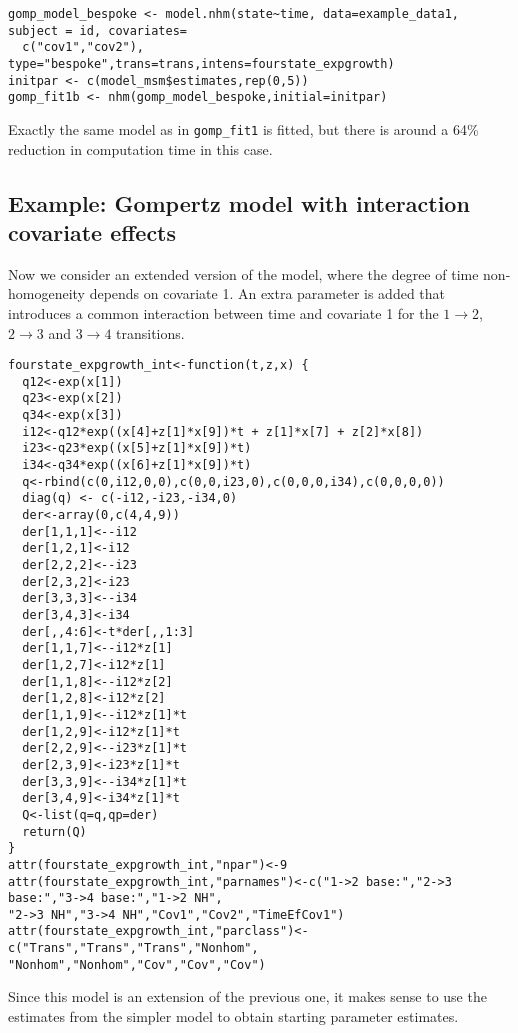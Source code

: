 \documentclass{article}
\numberwithin{equation}{section}
\begin{document}
\begin{verbatim}
gomp_model_bespoke <- model.nhm(state~time, data=example_data1, subject = id, covariates=
  c("cov1","cov2"),   type="bespoke",trans=trans,intens=fourstate_expgrowth)
initpar <- c(model_msm$estimates,rep(0,5))
gomp_fit1b <- nhm(gomp_model_bespoke,initial=initpar)
\end{verbatim}
Exactly the same model as in \verb!gomp_fit1! is fitted, but there is around a 64\% reduction in computation time in this case.

\subsection{Example: Gompertz model with interaction covariate effects}

Now we consider an extended version of the model, where the degree of time non-homogeneity depends on covariate 1. An extra parameter is added that introduces a common interaction between time and covariate 1 for the $1 \rightarrow 2$, $2 \rightarrow 3$ and $3 \rightarrow 4$ transitions.

\begin{verbatim}
fourstate_expgrowth_int<-function(t,z,x) {
  q12<-exp(x[1])
  q23<-exp(x[2])
  q34<-exp(x[3])
  i12<-q12*exp((x[4]+z[1]*x[9])*t + z[1]*x[7] + z[2]*x[8])
  i23<-q23*exp((x[5]+z[1]*x[9])*t)
  i34<-q34*exp((x[6]+z[1]*x[9])*t)
  q<-rbind(c(0,i12,0,0),c(0,0,i23,0),c(0,0,0,i34),c(0,0,0,0))
  diag(q) <- c(-i12,-i23,-i34,0)
  der<-array(0,c(4,4,9))
  der[1,1,1]<--i12
  der[1,2,1]<-i12
  der[2,2,2]<--i23
  der[2,3,2]<-i23
  der[3,3,3]<--i34
  der[3,4,3]<-i34
  der[,,4:6]<-t*der[,,1:3]
  der[1,1,7]<--i12*z[1]
  der[1,2,7]<-i12*z[1]
  der[1,1,8]<--i12*z[2]
  der[1,2,8]<-i12*z[2]
  der[1,1,9]<--i12*z[1]*t
  der[1,2,9]<-i12*z[1]*t
  der[2,2,9]<--i23*z[1]*t
  der[2,3,9]<-i23*z[1]*t
  der[3,3,9]<--i34*z[1]*t
  der[3,4,9]<-i34*z[1]*t
  Q<-list(q=q,qp=der)
  return(Q)
}
attr(fourstate_expgrowth_int,"npar")<-9
attr(fourstate_expgrowth_int,"parnames")<-c("1->2 base:","2->3 base:","3->4 base:","1->2 NH",
"2->3 NH","3->4 NH","Cov1","Cov2","TimeEfCov1")
attr(fourstate_expgrowth_int,"parclass")<-c("Trans","Trans","Trans","Nonhom",
"Nonhom","Nonhom","Cov","Cov","Cov")
\end{verbatim}
Since this model is an extension of the previous one, it makes sense to use the estimates from the simpler model to obtain starting parameter estimates.
\end{document}
